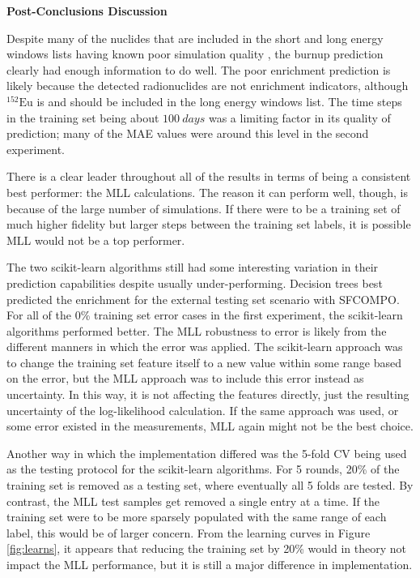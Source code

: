 \noindent \textbf{Post-Conclusions Discussion}

Despite many of the nuclides that are included in the short and long energy
windows lists having known poor simulation quality \cite{pwr_benchmark_2010,
skutnik_2021}, the burnup prediction clearly had enough information to do well.
The poor enrichment prediction is likely because the detected radionuclides are
not enrichment indicators, although ${}^{152}\text{Eu}$ is and should be
included in the long energy windows list. The time steps in the training set
being about $100\:days$ was a limiting factor in its quality of prediction;
many of the \gls{MAE} values were around this level in the second experiment. 


There is a clear leader throughout all of the results in terms of being a
consistent best performer: the \gls{MLL} calculations. The reason it can
perform well, though, is because of the large number of simulations.  If there
were to be a training set of much higher fidelity but larger steps between the
training set labels, it is possible \gls{MLL} would not be a top performer. 

The two scikit-learn algorithms still had some interesting variation in their
prediction capabilities despite usually under-performing. Decision trees best
predicted the enrichment for the external testing set scenario with
\gls{SFCOMPO}. For all of the 0\% training set error cases in the first
experiment, the scikit-learn algorithms performed better.  The \gls{MLL}
robustness to error is likely from the different manners in which the error was
applied.  The scikit-learn approach was to change the training set feature
itself to a new value within some range based on the error, but the \gls{MLL}
approach was to include this error instead as uncertainty. In this way, it is
not affecting the features directly, just the resulting uncertainty of the
log-likelihood calculation. If the same approach was used, or some error
existed in the measurements, \gls{MLL} again might not be the best choice. 

Another way in which the implementation differed was the 5-fold \gls{CV} being
used as the testing protocol for the scikit-learn algorithms. For 5 rounds,
20\% of the training set is removed as a testing set, where eventually all 5
folds are tested.  By contrast, the \gls{MLL} test samples get removed a single
entry at a time.  If the training set were to be more sparsely populated with
the same range of each label, this would be of larger concern.  From the
learning curves in Figure \ref{fig:learns}, it appears that reducing the
training set by 20\% would in theory not impact the \gls{MLL} performance, but
it is still a major difference in implementation. 

